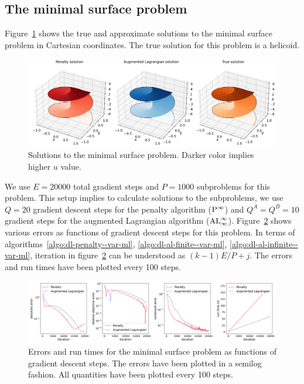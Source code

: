 \subsection{The minimal surface problem}\label{ssec:res-ms--var-ml}
Figure~\ref{fig:helicoid-surface--var-ml} shows the true and approximate solutions to the minimal surface problem in Cartesian coordinates. The true solution for this problem is a helicoid. 
\begin{figure}[!ht]
    \centering
\includegraphics[scale=0.4]{var-ml/plots/var-plots-helicoid-surface.png}
    \caption{Solutions to the minimal surface problem. Darker color implies higher $u$ value.}
    \label{fig:helicoid-surface--var-ml}
\end{figure}
We use $E=20000$ total gradient steps and $P=1000$ subproblems for this problem. This setup implies to calculate solutions to the subproblems, we use $Q=20$ gradient descent steps for the penalty algorithm (${\rm P}^\infty$) and $Q^A=Q^B=10$ gradient steps for the augmented Lagrangian algorithm (${\rm AL}^\infty_\infty$). Figure~\ref{fig:helicoid-error--var-ml} shows various errors as functions of gradient descent steps for this problem. In terms of algorithms~\ref{algo:dl-penalty--var-ml}, \ref{algo:dl-al-finite--var-ml}, \ref{algo:dl-al-infinite--var-ml}, iteration in figure~\ref{fig:helicoid-error--var-ml} can be understood as $(k-1)E/P+j$. The errors and run times have been plotted every 100 steps.
\begin{figure}[!ht]
    \centering
\includegraphics[scale=0.32]{var-ml/plots/var-plots-helicoid-error.png}
    \caption{Errors and run times for the minimal surface problem as functions of gradient descent steps. The errors have been plotted in a semilog fashion. All quantities have been plotted every 100 steps.}
    \label{fig:helicoid-error--var-ml}
\end{figure}
